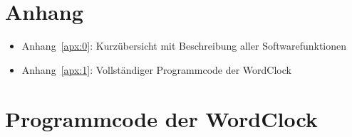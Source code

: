 
\chapter*{Anhang}

\begin{itemize}
    \item Anhang~\ref{apx:0}: Kurzübersicht mit Beschreibung aller Softwarefunktionen \dotfill~\pageref{apx:0}
    \item Anhang~\ref{apx:1}: Vollständiger Programmcode der WordClock \dotfill~\pageref{apx:1}
\end{itemize}

\chapter{Programmcode der WordClock}

